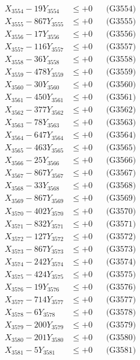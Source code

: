 \documentclass[a4paper,10pt]{article}
\begin{document}
{\begin{align}
X_{3554} - 19Y_{3554} &\leq +0 && \text{(G3554)} \\
X_{3555} - 867Y_{3555} &\leq +0 && \text{(G3555)} \\
X_{3556} - 17Y_{3556} &\leq +0 && \text{(G3556)} \\
X_{3557} - 116Y_{3557} &\leq +0 && \text{(G3557)} \\
X_{3558} - 36Y_{3558} &\leq +0 && \text{(G3558)} \\
X_{3559} - 478Y_{3559} &\leq +0 && \text{(G3559)} \\
X_{3560} - 30Y_{3560} &\leq +0 && \text{(G3560)} \\
\allowbreak
X_{3561} - 450Y_{3561} &\leq +0 && \text{(G3561)} \\
X_{3562} - 377Y_{3562} &\leq +0 && \text{(G3562)} \\
X_{3563} - 78Y_{3563} &\leq +0 && \text{(G3563)} \\
X_{3564} - 647Y_{3564} &\leq +0 && \text{(G3564)} \\
X_{3565} - 463Y_{3565} &\leq +0 && \text{(G3565)} \\
X_{3566} - 25Y_{3566} &\leq +0 && \text{(G3566)} \\
X_{3567} - 867Y_{3567} &\leq +0 && \text{(G3567)} \\
X_{3568} - 33Y_{3568} &\leq +0 && \text{(G3568)} \\
X_{3569} - 867Y_{3569} &\leq +0 && \text{(G3569)} \\
X_{3570} - 402Y_{3570} &\leq +0 && \text{(G3570)} \\
\allowbreak
X_{3571} - 832Y_{3571} &\leq +0 && \text{(G3571)} \\
X_{3572} - 127Y_{3572} &\leq +0 && \text{(G3572)} \\
X_{3573} - 867Y_{3573} &\leq +0 && \text{(G3573)} \\
X_{3574} - 242Y_{3574} &\leq +0 && \text{(G3574)} \\
X_{3575} - 424Y_{3575} &\leq +0 && \text{(G3575)} \\
X_{3576} - 19Y_{3576} &\leq +0 && \text{(G3576)} \\
X_{3577} - 714Y_{3577} &\leq +0 && \text{(G3577)} \\
X_{3578} - 6Y_{3578} &\leq +0 && \text{(G3578)} \\
X_{3579} - 200Y_{3579} &\leq +0 && \text{(G3579)} \\
X_{3580} - 201Y_{3580} &\leq +0 && \text{(G3580)} \\
\allowbreak
X_{3581} - 5Y_{3581} &\leq +0 && \text{(G3581)} \\

\end{align}}
\end{document}
